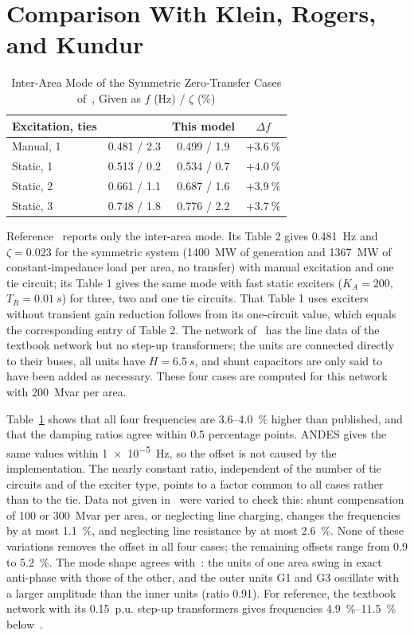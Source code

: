 \documentclass[conference]{IEEEtran}
\begin{document}
\section{Comparison With Klein, Rogers, and Kundur}
\begin{table}[!t]
\caption{Inter-Area Mode of the Symmetric Zero-Transfer Cases of~\cite{klein}, Given as $f$ (Hz) / $\zeta$ (\%)}
\label{tab:klein}
\centering\footnotesize\setlength{\tabcolsep}{4pt}
\begin{tabular}{@{}lccc@{}}
\toprule
Excitation, ties & \cite{klein} & This model & $\Delta f$\\
\midrule
Manual, 1 & 0.481 / 2.3 & 0.499 / 1.9 & $+\SI{3.6}{\percent}$\\
Static, 1 & 0.513 / 0.2 & 0.534 / 0.7 & $+\SI{4.0}{\percent}$\\
Static, 2 & 0.661 / 1.1 & 0.687 / 1.6 & $+\SI{3.9}{\percent}$\\
Static, 3 & 0.748 / 1.8 & 0.776 / 2.2 & $+\SI{3.7}{\percent}$\\
\bottomrule
\end{tabular}
\end{table}
Reference~\cite{klein} reports only the inter-area mode. Its Table 2 gives \SI{0.481}{Hz} and $\zeta=0.023$ for the symmetric system (\SI{1400}{MW} of generation and \SI{1367}{MW} of constant-impedance load per area, no transfer) with manual excitation and one tie circuit; its Table 1 gives the same mode with fast static exciters ($K_A=200$, $T_R=\SI{0.01}{s}$) for three, two and one tie circuits. That Table 1 uses exciters without transient gain reduction follows from its one-circuit value, which equals the corresponding entry of Table 2. The network of~\cite[Fig.~1]{klein} has the line data of the textbook network but no step-up transformers; the units are connected directly to their buses, all units have $H=\SI{6.5}{s}$, and shunt capacitors are only said to have been added as necessary. These four cases are computed for this network with \SI{200}{Mvar} per area.

Table~\ref{tab:klein} shows that all four frequencies are 3.6--\SI{4.0}{\percent} higher than published, and that the damping ratios agree within 0.5 percentage points. ANDES gives the same values within \SI{1e-5}{Hz}, so the offset is not caused by the implementation. The nearly constant ratio, independent of the number of tie circuits and of the exciter type, points to a factor common to all cases rather than to the tie. Data not given in~\cite{klein} were varied to check this: shunt compensation of 100 or \SI{300}{Mvar} per area, or neglecting line charging, changes the frequencies by at most \SI{1.1}{\percent}, and neglecting line resistance by at most \SI{2.6}{\percent}. None of these variations removes the offset in all four cases; the remaining offsets range from 0.9 to \SI{5.2}{\percent}. The mode shape agrees with~\cite[Fig.~2]{klein}: the units of one area swing in exact anti-phase with those of the other, and the outer units G1 and G3 oscillate with a larger amplitude than the inner units (ratio 0.91). For reference, the textbook network with its 0.15~p.u. step-up transformers gives frequencies \SIrange{4.9}{11.5}{\percent} below~\cite{klein}.
\end{document}
